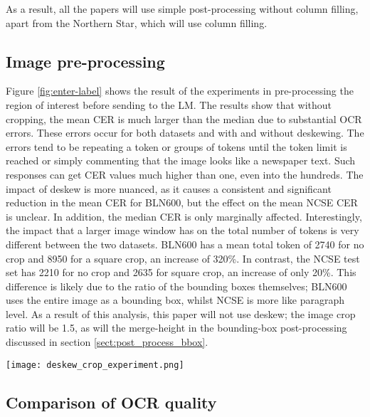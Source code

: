 \documentclass{article} %
\begin{document}
As a result, all the papers will use simple post-processing without column filling, apart from the Northern Star, which will use column filling.

\subsection{Image pre-processing}

Figure \ref{fig:enter-label} shows the result of the experiments in pre-processing the region of interest before sending to the LM. The results show that without cropping, the mean CER is much larger than the median due to substantial OCR errors. These errors occur for both datasets and with and without deskewing. The errors tend to be repeating a token or groups of tokens until the token limit is reached or simply commenting that the image looks like a newspaper text. Such responses can get CER values much higher than one, even into the hundreds. The impact of deskew is more nuanced, as it causes a consistent and significant reduction in the mean CER for BLN600, but the effect on the mean NCSE CER is unclear. In addition, the median CER is only marginally affected. Interestingly, the impact that a larger image window has on the total number of tokens is very different between the two datasets. BLN600 has a mean total token of 2740 for no crop and 8950 for a square crop, an increase of 320\%. In contrast, the NCSE test set has 2210 for no crop and 2635 for square crop, an increase of only 20\%. This difference is likely due to the ratio of the bounding boxes themselves; BLN600 uses the entire image as a bounding box, whilst NCSE is more like paragraph level. As a result of this analysis, this paper will not use deskew; the image crop ratio will be 1.5, as will the merge-height in the bounding-box post-processing discussed in section \ref{sect:post_process_bbox}.


\begin{figure*}
    \centering
    \texttt{[image: deskew\_crop\_experiment.png]}
    \caption{Pre-processing the image can significantly decrease the CER of the returned text. There is a much larger decrease in the mean CER than the median, indicating that the probability of major errors in a text is substantially reduced by pre-processing}
    \label{fig:enter-label}
\end{figure*}


\subsection{Comparison of OCR quality}
\end{document}
